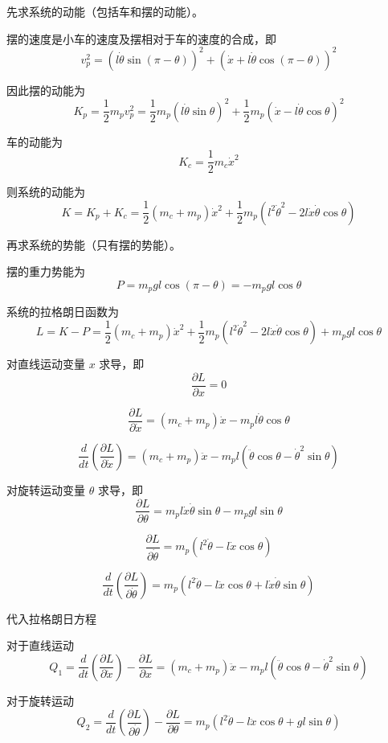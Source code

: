 \documentclass{homework}
\begin{document}
\question

\begin{sol}

先求系统的动能（包括车和摆的动能）。

摆的速度是小车的速度及摆相对于车的速度的合成，即
\[
  v_p^2 = (l \dot{\theta} \sin(\pi - \theta))^2 + (\dot{x} + l \dot{\theta} \cos(\pi - \theta))^2 
\]

因此摆的动能为
\[
  K_p = \frac{1}{2} m_p v_p^2 = \frac{1}{2} m_p (l \dot{\theta} \sin\theta)^2 + \frac{1}{2} m_p (\dot{x} - l \dot{\theta} \cos\theta)^2
\]

车的动能为
\[
  K_c = \frac{1}{2} m_c \dot{x}^2
\]

则系统的动能为
\[
  K = K_p + K_c = \frac{1}{2} (m_c + m_p) \dot{x}^2 + \frac{1}{2} m_p (l^2 \dot{\theta}^2 - 2 l \dot{x} \dot{\theta} \cos\theta)
\]

再求系统的势能（只有摆的势能）。

摆的重力势能为
\[
  P = m_p g l \cos(\pi - \theta) = - m_p g l \cos\theta
\]

系统的拉格朗日函数为
\[
  L = K - P = \frac{1}{2} (m_c + m_p) \dot{x}^2 + \frac{1}{2} m_p (l^2 \dot{\theta}^2 - 2 l \dot{x} \dot{\theta} \cos\theta) + m_p g l \cos\theta
\]

对直线运动变量 $ x $ 求导，即
\[
  \frac{\partial L}{\partial x} = 0
\]

\[
  \frac{\partial L}{\partial \dot{x}} = (m_c + m_p) \dot{x} - m_p l \dot{\theta} \cos\theta
\]

\[
  \frac{d}{dt}(\frac{\partial L}{\partial \dot{x}}) = (m_c + m_p) \ddot{x} - m_p l (\ddot{\theta} \cos\theta - \dot{\theta}^2 \sin\theta)
\]

对旋转运动变量 $ \theta $ 求导，即
\[
  \frac{\partial L}{\partial \theta} = m_p l \dot{x} \dot{\theta} \sin\theta - m_p g l \sin\theta
\]

\[
  \frac{\partial L}{\partial \dot{\theta}} = m_p (l^2 \dot{\theta} - l \dot{x} \cos\theta)
\]

\[
  \frac{d}{dt}(\frac{\partial L}{\partial \dot{\theta}}) = m_p (l^2 \ddot{\theta} - l \ddot{x} \cos\theta + l \dot{x} \dot{\theta} \sin\theta)
\]

代入拉格朗日方程

对于直线运动
\[
  Q_1 = \frac{d}{dt}(\frac{\partial L}{\partial \dot{x}}) - \frac{\partial L}{\partial x} = (m_c + m_p) \ddot{x} - m_p l (\ddot{\theta} \cos\theta - \dot{\theta}^2 \sin\theta)
\]

对于旋转运动
\[
  Q_2 = \frac{d}{dt}(\frac{\partial L}{\partial \dot{\theta}}) - \frac{\partial L}{\partial \theta} = m_p (l^2 \ddot{\theta} - l \ddot{x} \cos\theta + g l \sin\theta)
\]


\end{sol}
\end{document}
